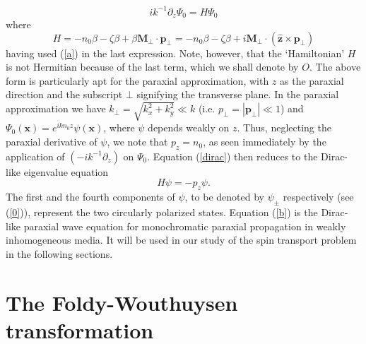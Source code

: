 \documentclass[aps,pra,preprint,superscriptaddress,showpacs,showkeys]{revtex4}
\begin{document}
\begin{equation}
ik^{-1}\partial_z \Psi_0=H \Psi_0 \label{dirac} 
\end{equation}
where 
$$H=-n_0 \beta-\zeta\beta+\beta \textbf{M}_\bot \cdot \textbf{p}_\bot=-n_0 \beta-\zeta\beta+i\textbf{M}_\bot \cdot (\hat{\textbf{z}} \times \textbf{p}_\bot)$$ 
having used (\ref{a}) in the last expression. Note, however, that the `Hamiltonian' $H$ is not Hermitian because of the last term, which we shall denote by $O$. The above form is particularly apt for the paraxial approximation, with $z$ as the paraxial direction and the subscript $\bot$ signifying the transverse plane. In the paraxial approximation we have $k_\bot=\sqrt{k_x^2+k_y^2}\ll k$ (i.e. $p_\bot=|\textbf{p}_\bot|\ll 1$) and $\Psi_0(\textbf{x})=e^{ikn_0z} \psi(\textbf{x})$, where $\psi$ depends weakly on $z$. Thus, neglecting the paraxial derivative of $\psi$, we note that $p_z=n_0$, as seen immediately by the application of $(-ik^{-1}\partial_z)$ on $\Psi_0$. Equation (\ref{dirac}) then reduces to the Dirac-like eigenvalue equation
\begin{equation}
H\psi=-p_z\psi. \label{b}
\end{equation}
The first and the fourth components of $\psi$, to be denoted by $\psi_\pm$ respectively (see (\ref{0})), represent the two circularly polarized states. Equation (\ref{b}) is the Dirac-like paraxial wave equation for monochromatic paraxial propagation in weakly inhomogeneous media. It will be used in our study of the spin transport problem in the following sections.

\section{The Foldy-Wouthuysen transformation}
\end{document}
